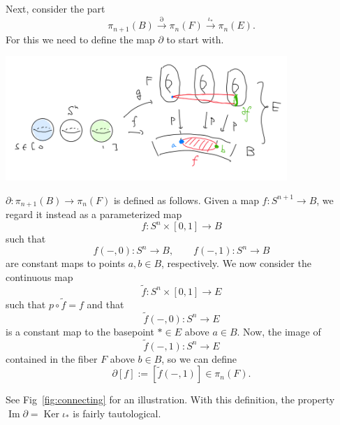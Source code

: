 \documentclass[12pt]{article}
\numberwithin{equation}{section}
\renewenvironment{figure}[1][]{
  \begin{originalfigure}[#1]
    \begin{mdframed}[linecolor=black!0,backgroundcolor=black!1]
}{
    \end{mdframed}
  \end{originalfigure}
}
\def\Ker{\mathop{\mathrm{Ker}}}
\def\Im{\mathop{\mathrm{Im}}}
\begin{document}
Next, consider the part \begin{equation}
  \pi_{n+1}(B)\stackrel{\partial}{\longrightarrow}\pi_{n}(F) \stackrel{\iota_*}{\longrightarrow} \pi_{n}(E).
\end{equation}
For this we need to define the map $\partial$ to start with.
\begin{figure}[h]
  \centering
  \includegraphics[width=0.8\textwidth]{connecting.png}
  \caption{The connecting map $\partial$}
  \label{fig:connecting}
\end{figure}
\begin{definition}
  \label{def:connecting-map-homotopy}
  $\partial:\pi_{n+1}(B)\to \pi_{n}(F)$ is defined as follows.
  Given a map $f:S^{n+1}\to B$, we regard it instead as a parameterized map
  \begin{equation}
  f: S^n\times [0,1] \to B
  \end{equation} such that \begin{equation}
    f(-,0):S^n\to B,\qquad
    f(-,1):S^n\to B
  \end{equation}
  are constant maps to points $a,b\in B$, respectively.
  We now consider the continuous map \begin{equation}
    \tilde f:S^n\times [0,1]\to E
  \end{equation}
  such that $p\circ \tilde f=f$ and that \begin{equation}
    \tilde f(-,0): S^n\to E
  \end{equation} is a constant map to the basepoint $*\in E$ above $a\in B$.
  Now, the image of  \begin{equation}
    \tilde f(-,1): S^n\to E
  \end{equation} contained in the fiber $F$ above $b\in B$,
  so we can define \begin{equation}
    \partial [f] := [\tilde f(-,1)]\in \pi_n(F).
  \end{equation}
\end{definition}
See Fig~\ref{fig:connecting} for an illustration.
With this definition, the property $\Im \partial = \Ker \iota_*$ is fairly tautological.
\end{document}
